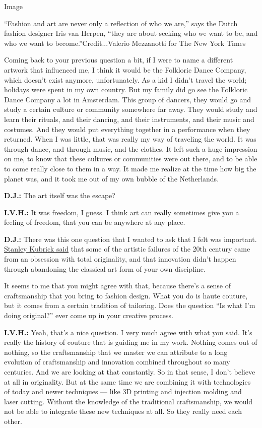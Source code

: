 Image

``Fashion and art are never only a reflection of who we are,'' says the
Dutch fashion designer Iris van Herpen, ``they are about seeking who we
want to be, and who we want to become.''Credit...Valerio Mezzanotti for
The New York Times

Coming back to your previous question a bit, if I were to name a
different artwork that influenced me, I think it would be the Folkloric
Dance Company, which doesn't exist anymore, unfortunately. As a kid I
didn't travel the world; holidays were spent in my own country. But my
family did go see the Folkloric Dance Company a lot in Amsterdam. This
group of dancers, they would go and study a certain culture or community
somewhere far away. They would study and learn their rituals, and their
dancing, and their instruments, and their music and costumes. And they
would put everything together in a performance when they returned. When
I was little, that was really my way of traveling the world. It was
through dance, and through music, and the clothes. It left such a huge
impression on me, to know that these cultures or communities were out
there, and to be able to come really close to them in a way. It made me
realize at the time how big the planet was, and it took me out of my own
bubble of the Netherlands.

\textbf{D.J.:} The art itself was the escape?

\textbf{I.V.H.:} It was freedom, I guess. I think art can really
sometimes give you a feeling of freedom, that you can be anywhere at any
place.

\textbf{D.J.:} There was this one question that I wanted to ask that I
felt was important.
\href{https://variety.com/2020/film/reviews/kubrick-by-kubrick-review-1234601551/}{Stanley
Kubrick said} that some of the artistic failures of the 20th century
came from an obsession with total originality, and that innovation
didn't happen through abandoning the classical art form of your own
discipline.

It seems to me that you might agree with that, because there's a sense
of craftsmanship that you bring to fashion design. What you do is haute
couture, but it comes from a certain tradition of tailoring. Does the
question ``Is what I'm doing original?'' ever come up in your creative
process.

\textbf{I.V.H.:} Yeah, that's a nice question. I very much agree with
what you said. It's really the history of couture that is guiding me in
my work. Nothing comes out of nothing, so the craftsmanship that we
master we can attribute to a long evolution of craftsmanship and
innovation combined throughout so many centuries. And we are looking at
that constantly. So in that sense, I don't believe at all in
originality. But at the same time we are combining it with technologies
of today and newer techniques --- like 3D printing and injection molding
and laser cutting. Without the knowledge of the traditional
craftsmanship, we would not be able to integrate these new techniques at
all. So they really need each other.


